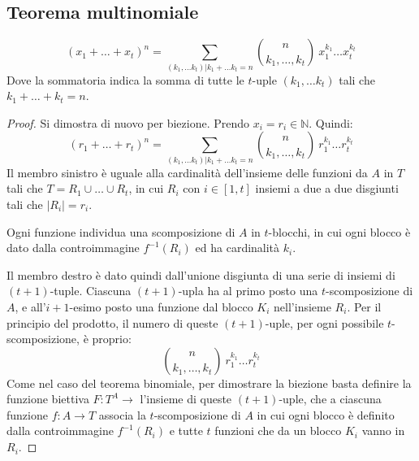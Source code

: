 \subsection{Teorema multinomiale}
\begin{prop}
\[
(x_1 + \dots + x_t)^n = \sum_{(k_1, \dots k_t) | k_1 + \dots k_t = n}
\binom{n}{k_1, \dots, k_t} \ x_1^{k_1} \dots x_t^{k_t}
\]
Dove la sommatoria indica la somma di tutte le $t$-uple $(k_1, \dots k_t)$ tali che $k_1 + \dots + k_t = n$.
\end{prop}
\begin{proof}
Si dimostra di nuovo per biezione. Prendo $x_i = r_i \in \mathbb{N}$. Quindi:
\[
(r_1 + \dots + r_t)^n = \sum_{(k_1, \dots k_t) | k_1 + \dots k_t = n}
\binom{n}{k_1, \dots, k_t} \ r_1^{k_1} \dots r_t^{k_t}
\]
Il membro sinistro \`e uguale alla cardinalit\`a dell'insieme delle funzioni da $A$ in $T$ tali che $T = R_1 \cup \dots \cup R_t$, in cui $R_i $ con $i \in [1, t]$ insiemi a due a due disgiunti tali che $| R_i | = r_i$.

Ogni funzione individua una scomposizione di $A$ in $t$-blocchi, in cui ogni blocco \`e dato dalla controimmagine $f^{-1} (R_i)$ ed ha cardinalit\`a $k_i$. 

Il membro destro \`e dato quindi dall'unione disgiunta di una serie di insiemi di $(t+1)$-tuple. Ciascuna $(t+1)$-upla ha al primo posto una $t$-scomposizione di $A$, e all'$i+1$-esimo posto una funzione dal blocco $K_i$ nell'insieme $R_i$. Per il principio del prodotto, il numero di queste $(t+1)$-uple, per ogni possibile $t$-scomposizione, \`e proprio:
\[
\binom{n}{k_1, \dots, k_t} \ r_1^{k_1} \dots r_t^{k_t}
\]
Come nel caso del teorema binomiale, per dimostrare la biezione basta definire la funzione biettiva $F : T^A \to$ l'insieme di queste $(t+1)$-uple, che a ciascuna funzione $f : A \to T$ associa la $t$-scomposizione di $A$ in cui ogni blocco \`e definito dalla controimmagine $f^{-1} (R_i)$ e tutte $t$ funzioni che da un blocco $K_i$ vanno in $R_i$.
\end{proof}